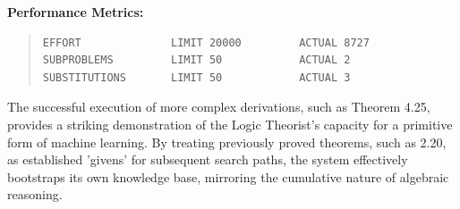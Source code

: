 \documentclass[journal]{IEEEtran}
\begin{document}
\begin{enumerate}
\end{enumerate}

\textbf{Performance Metrics:}
\begin{quote}
\begin{verbatim}
EFFORT              LIMIT 20000         ACTUAL 8727
SUBPROBLEMS         LIMIT 50            ACTUAL 2
SUBSTITUTIONS       LIMIT 50            ACTUAL 3
\end{verbatim}
\end{quote}

\medskip

\noindent The successful execution of more complex derivations, such as Theorem
4.25, provides a striking demonstration of the Logic Theorist’s
capacity for a primitive form of machine learning. By treating
previously proved theorems, such as 2.20, as established 'givens' for
subsequent search paths, the system effectively bootstraps its own
knowledge base, mirroring the cumulative nature of algebraic reasoning.
\end{document}
